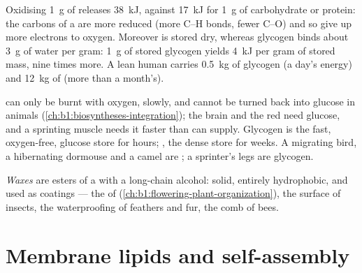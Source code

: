 \begin{proposition}\label{prop:b1:lipids:energystore}
Oxidising \qty{1}{g} of  releases \qty{38}{kJ}, against \qty{17}{kJ}
for \qty{1}{g} of carbohydrate or protein: the carbons of a 
are more reduced (more C--H bonds, fewer C--O) and so give up more
electrons to oxygen. Moreover  is stored dry, whereas glycogen binds
about \qty{3}{g} of water per gram: \qty{1}{g} of stored glycogen
yields \qty{4}{kJ} per gram of stored mass,  nine times more. A lean
human carries \qty{0.5}{kg} of glycogen (a day's energy) and
\qty{12}{kg} of  (more than a month's).
\end{proposition}

\begin{example}\label{ex:b1:lipids:whyglycogen}
 can only be burnt with oxygen, slowly, and cannot be turned back
into glucose in animals (\cref{ch:b1:biosyntheses-integration}); the
brain and the red  need glucose, and a sprinting muscle needs it
faster than  can supply. Glycogen is the fast, oxygen-free, glucose
store for hours; , the dense store for weeks. A migrating bird, a
hibernating dormouse and a camel are ; a sprinter's legs are
glycogen.
\end{example}

\begin{definition}[Waxes]\label{def:b1:lipids:wax}
\emph{Waxes} are esters of a  with a long-chain
alcohol: solid, entirely hydrophobic, and used as coatings --- the
 of  (\cref{ch:b1:flowering-plant-organization}), the
surface of insects, the waterproofing of feathers and fur, the comb of
bees.
\end{definition}

\section{Membrane lipids and self-assembly}

